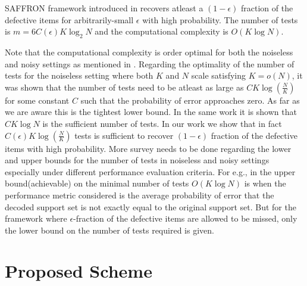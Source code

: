 \documentclass[conference,twocolumn]{IEEEtran}
\begin{document}
\begin{theorem}
SAFFRON framework introduced in \cite{lee2015saffron} recovers atleast a $(1-\epsilon)$ fraction of the defective items for arbitrarily-small $\epsilon$ with high probability. The number of tests is $m=6C(\epsilon)K \log_{2}N$ and the computational complexity is $O(K\log N)$.
\end{theorem}
Note that the computational complexity is order optimal for both the noiseless and noisy settings as mentioned in \cite{lee2015pedarsani}. Regarding the optimality of the number of tests for the noiseless setting where both $K$ and $N$ scale satisfying $K=o(N)$, it was shown \cite{atia2012boolean} that the number of tests need to be atleast as large as $C K \log (\frac{N}{K})$ for some constant $C$ such that the probability of error approaches zero. As far as we are aware this is the tightest lower bound. In the same work it is shown that $C K \log N$ is the sufficient number of tests. In our work we show that in fact $C(\epsilon) K \log(\frac{N}{K})$ tests is sufficient to recover $(1-\epsilon)$ fraction of the defective items with high probability. More survey needs to be done regarding the lower and upper bounds for the number of tests in noiseless and noisy settings especially under different performance evaluation criteria. For e.g., in \cite{atia2012boolean} the upper bound(achievable) on the minimal number of tests $O(K \log N)$ is when the performance metric considered is the average probability of error that the decoded support set is not exactly equal to the original support set. But for the framework where $\epsilon$-fraction of the defective items are allowed to be missed, only the lower bound on the number of tests required is given. 

\section{Proposed Scheme}




\end{document}
